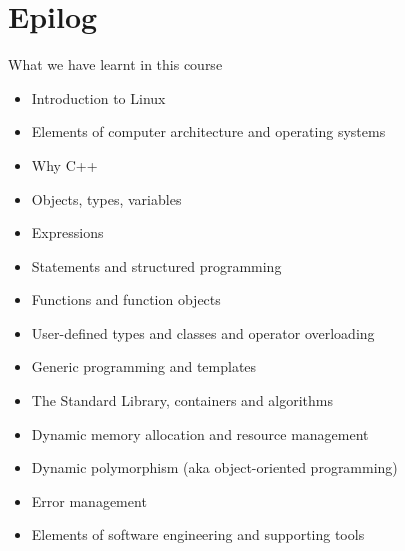 

\section*{Epilog}

\begin{frame}{What we have learnt in this course}
  \begin{itemize}
  \item Introduction to Linux
  \item Elements of computer architecture and operating systems
  \item Why C++
  \item Objects, types, variables
  \item Expressions
  \item Statements and structured programming
  \item Functions and function objects
  \item User-defined types and classes and operator overloading
  \item Generic programming and templates
  \item The Standard Library, containers and algorithms
  \item Dynamic memory allocation and resource management
  \item Dynamic polymorphism (aka object-oriented programming)
  \item Error management
  \item Elements of software engineering and supporting tools
  \end{itemize}
\end{frame}

